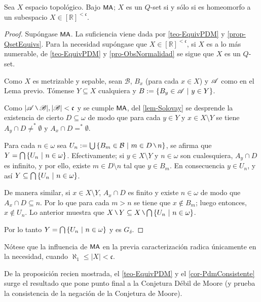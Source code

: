     \begin{proposicion}\label{pro-MaQsetChar}
        Sea $X$ espacio topológico. Bajo $\text{\textsf{\small MA}}$; $X$ es un $Q$-set si y sólo si es homeomorfo a un subespacio $X \in [\mathbb{R}]^{<\mathfrak{c}}$.
    \end{proposicion}
        \begin{proof}
            Supóngase $\text{\textsf{\small MA}}$. La suficiencia viene dada por \ref{teo-EquivPDM} y \ref{prop-QsetEquivs}. Para la necesidad supóngase que $X \in [\mathbb{R}]^{<\mathfrak{c}}$, si $X$ es a lo más numerable, de \ref{teo-EquivPDM} y \ref{pro-ObsNormalidad} se sigue que $X$ es un $Q$-set.
            
            Como $X$ es metrizable y sepable, sean $\mathcal{B}$, $B_x$ (para cada $x \in X$) y $\mathscr{A}$ como en el Lema previo. Tómense $Y \subseteq X$ cualquiera y $B:=\{B_y \in \mathscr{A} \text{ $|$ } y \in Y\}$.
            
            Como $|\ms{A} \setminus \ms{B}|,|\ms{B}|<\mathfrak{c}$ y se cumple $\text{\textsf{\small MA}}$, del \autoref{lem-Solovay} se desprende la existencia de cierto $D \subseteq \omega$ de modo que para cada $y \in Y$ y $x \in X \setminus Y$ se tiene $A_y \cap D\neq ^*\emptyset$ y $A_x \cap D= ^*\emptyset$.

            Para cada $n \in \omega$ sea $U_n:=\midcup\{ B_m \in \mathcal{B} \tq m \in D \setminus n \}$, se afirma que $Y=\mbox{$\bigcap$}\,\{U_n \text{ $|$ } n \in \omega\}$. Efectivamente; si $y \in X \setminus Y$ y $n \in \omega$ son cualesquiera, $A_y \cap D$ es infinito, y por ello, existe $m \in D \setminus n$ tal que $y \in B_m$. En consecuencia $y \in U_n$, y así $Y \subseteq \mbox{$\bigcap$}\,\{U_n \text{ $|$ } n \in \omega\}$.
            
            De manera similar, si $x \in X \setminus Y$, $A_x \cap D$ es finito y existe $n \in \omega$ de modo que $A_x \cap D \subseteq n$. Por lo que para cada $m > n$ se tiene que $x \notin B_m$; luego entonces, $x \notin U_n$. Lo anterior muestra que $X \setminus Y \subseteq X \setminus \midcap\{U_n \tq n \in \omega\}$.

            Por lo tanto $Y=\mbox{$\bigcap$}\,\{U_n \text{ $|$ } n \in \omega\}$ y es $G_\delta$.
        \end{proof}

        Nótese que la influencia de $\text{\textsf{\small MA}}$ en la previa caracterización radica únicamente en la necesidad, cuando $\aleph_1 \leq |X| < \mathfrak{c}$.

        De la proposición recien mostrada, el \autoref{teo-EquivPDM} y el \autoref{cor-PdmConsistente} surge el resultado que pone punto final a la Conjetura Débil de Moore (y prueba la consistencia de la negación de la Conjetura de Moore).

